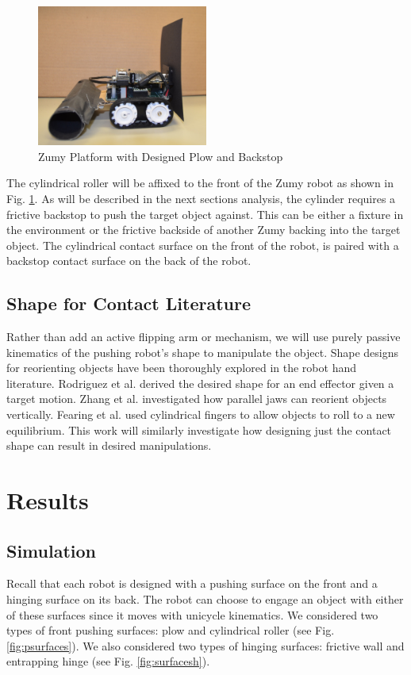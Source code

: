 \documentclass[a4paper]{article}
\begin{document}
\begin{figure}
\centering
\includegraphics[width=0.5\textwidth]{EquippedZumy.jpg}
\caption{\label{fig:zumy}Zumy Platform with Designed Plow and Backstop}
\end{figure}

The cylindrical roller will be affixed to the front of the Zumy robot as shown in Fig. \ref{fig:zumy}.
As will be described in the next sections analysis, the cylinder requires a frictive backstop to push the target object against.
This can be either a fixture in the environment or the frictive backside of another Zumy backing into the target object.
The cylindrical contact surface on the front of the robot, is paired with a backstop contact surface on the back of the robot.

\subsection{Shape for Contact Literature}
Rather than add an active flipping arm or mechanism, we will use purely passive kinematics of the pushing robot's shape to manipulate the object.
Shape designs for reorienting objects have been thoroughly explored in the robot hand literature.
Rodriguez et al.\cite{rodriguez2013effector} derived the desired shape for an end effector given a target motion.
Zhang et al.\cite{zhang2002gripper} investigated how parallel jaws can reorient objects vertically.
Fearing et al. \cite{fearing1986simplified} used cylindrical fingers to allow objects to roll to a new equilibrium.
This work will similarly investigate how designing just the contact shape can result in desired manipulations.

\clearpage
\section{Results}
\subsection{Simulation}
Recall that each robot is designed with a pushing surface on the front and a hinging surface on its back.
The robot can choose to engage an object with either of these surfaces since it moves with unicycle kinematics.
We considered two types of front pushing surfaces: plow and cylindrical roller (see Fig. \ref{fig:psurfaces}).
We also considered two types of hinging surfaces: frictive wall and entrapping hinge (see Fig. \ref{fig:surfacesh}).
\end{document}
